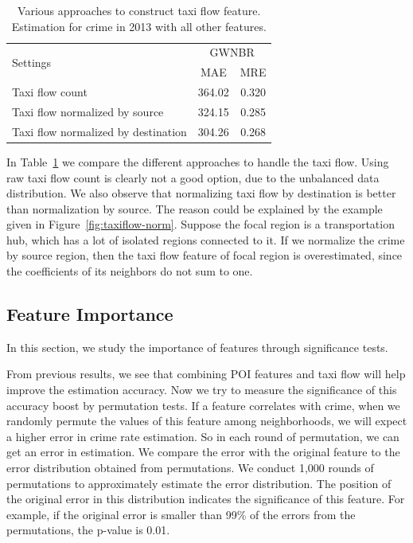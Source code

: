{\begin{table}[h]
\centering
\caption{Various approaches to construct taxi flow feature. Estimation for crime in 2013 with all other features.}{
\label{tb:tf-design}
\begin{tabular}{|l|c|c|}
\hline
\multirow{2}{*}{Settings} & \multicolumn{2}{|c|}{GWNBR} \\ \cline{2-3}
	& MAE & MRE \\ \hline
Taxi flow count & 364.02 & 0.320 \\ \hline
Taxi flow normalized by source & 324.15 & 0.285 \\ \hline
Taxi flow normalized by destination & 304.26& 0.268\\ \hline
\end{tabular}}
\end{table}


In Table~\ref{tb:tf-design} we compare the different approaches to handle the taxi flow. Using raw taxi flow count is clearly not a good option, due to the unbalanced data distribution. We also observe that normalizing taxi flow by destination is better than normalization by source. The reason could be explained by the example given in Figure~\ref{fig:taxiflow-norm}. Suppose the focal region is a transportation hub, which has a lot of isolated regions connected to it. If we normalize the crime by source region, then the taxi flow feature of focal region is overestimated, since the coefficients of its neighbors do not sum to one. 
}



\subsection{Feature Importance}

In this section, we study the importance of features through significance tests.


From previous results, we see that combining POI features and taxi flow will help improve the estimation accuracy. Now we try to measure the significance of this accuracy boost by permutation tests. If a feature correlates with crime, when we randomly permute the values of this feature among neighborhoods, we will expect a higher error in crime rate estimation. So in each round of permutation, we can get an error in estimation. We compare the error with the original feature to the error distribution obtained from permutations. We conduct 1,000 rounds of permutations to approximately estimate the error distribution. The position of the original error in this distribution indicates the significance of this feature. For example, if the original error is smaller than 99\% of the errors from the permutations, the p-value is 0.01. 

